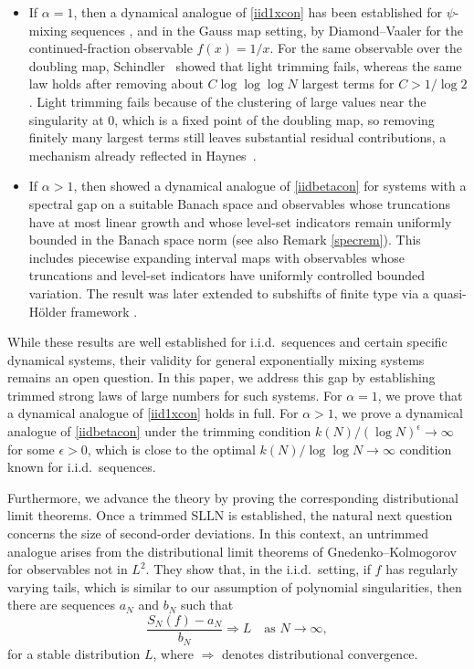 \documentclass[11pt,twoside,a4paper,reqno]{amsart}
\newcommand{\as}[1]{\text{as } #1 \rightarrow\infty}
\begin{document}
\begin{itemize}
\item If $\alpha = 1$, then a dynamical analogue of \eqref{iid1xcon} has been established for $\psi$-mixing sequences \cite{AARONSONpsi}, and in the Gauss map setting, by Diamond--Vaaler \cite{DIAMOND1986} for the continued-fraction observable $f(x)=1/x$. For the same observable over the doubling map, Schindler~\cite{Sch18} showed that light trimming fails, whereas the same law holds after removing about $C\log\log\log N$ largest terms for $C>1/\log 2$. Light trimming fails because of the clustering of large values near the singularity at $0$, which is a fixed point of the doubling map, so removing finitely many largest terms still leaves substantial residual contributions, a mechanism already reflected in Haynes~\cite[Theorem~4]{Haynes14}.



\item If $\alpha > 1$, then \cite{KessSchiSLLN} showed a dynamical analogue of \eqref{iidbetacon} for systems with a spectral gap on a suitable Banach space and observables whose truncations have at most linear growth and whose level-set indicators remain uniformly bounded in the Banach space norm (see also Remark \ref{specrem}). This includes piecewise expanding interval maps with observables whose truncations and level-set indicators have uniformly controlled bounded variation. The result was later extended to subshifts of finite type via a quasi-H\"older framework \cite{KS20}.
\end{itemize}




While these results are well established for i.i.d.\ sequences and certain specific dynamical systems, their validity for general exponentially mixing systems remains an open question. In this paper, we address this gap by establishing trimmed strong laws of large numbers for such systems. For $\alpha=1$, we prove that a dynamical analogue of \eqref{iid1xcon} holds in full. For $\alpha>1$, we prove {a dynamical analogue of \eqref{iidbetacon}} under the trimming condition $k(N)/(\log N)^{\epsilon} \to \infty$ for some $\epsilon > 0$, which is close to the optimal $k(N)/\log\log N \to \infty$ condition known for i.i.d.\ sequences.


Furthermore, we advance the theory by proving the corresponding distributional limit theorems. Once a trimmed SLLN is established, the natural next question concerns the size of second-order deviations. In this context, an untrimmed analogue arises from the distributional limit theorems of Gnedenko--Kolmogorov~\cite{gnedenko1968limit} for observables not in $L^2$. They show that, in the i.i.d.\ setting, if $f$ has regularly varying tails, which is similar to our assumption of polynomial singularities, then there are sequences $a_N$ and $b_N$ such that
\begin{equation*}
\frac{S_N(f) - a_N}{b_N} \Rightarrow L \quad \as{N},
\end{equation*}
for a stable distribution $L$, where $\Rightarrow$ denotes distributional convergence.
\end{document}
